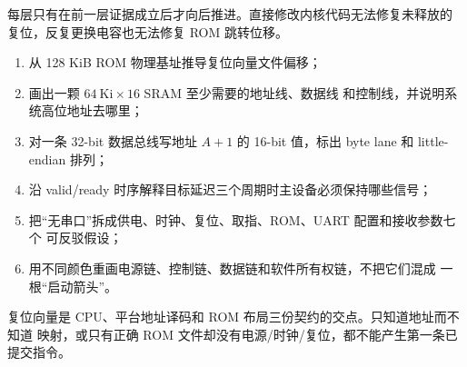 每层只有在前一层证据成立后才向后推进。直接修改内核代码无法修复未释放的
复位，反复更换电容也无法修复 ROM 跳转位移。

\begin{enumerate}[leftmargin=2.2em]
  \item 从 128 KiB ROM 物理基址推导复位向量文件偏移；
  \item 画出一颗 \(64\ \mathrm{Ki}\times16\) SRAM 至少需要的地址线、数据线
        和控制线，并说明系统高位地址去哪里；
  \item 对一条 32-bit 数据总线写地址 \(A+1\) 的 16-bit 值，标出 byte lane
        和 little-endian 排列；
  \item 沿 valid/ready 时序解释目标延迟三个周期时主设备必须保持哪些信号；
  \item 把“无串口”拆成供电、时钟、复位、取指、ROM、UART 配置和接收参数七个
        可反驳假设；
  \item 用不同颜色重画电源链、控制链、数据链和软件所有权链，不把它们混成
        一根“启动箭头”。
\end{enumerate}

\begin{failurebox}
复位向量是 CPU、平台地址译码和 ROM 布局三份契约的交点。只知道地址而不知道
映射，或只有正确 ROM 文件却没有电源/时钟/复位，都不能产生第一条已提交指令。
\end{failurebox}
